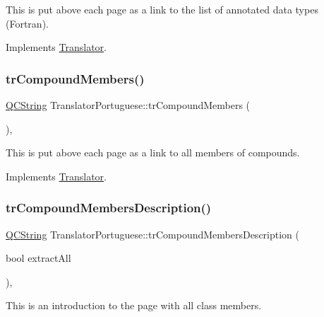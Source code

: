 This is put above each page as a link to the list of annotated data types (Fortran). 

Implements \mbox{\hyperlink{class_translator}{Translator}}.

\mbox{\label{class_translator_portuguese_a2b87e8d349a1ee07c93f6333b340874f}} 
\subsubsection{\texorpdfstring{trCompoundMembers()}{trCompoundMembers()}}
{\footnotesize\ttfamily \mbox{\hyperlink{class_q_c_string}{Q\+C\+String}} Translator\+Portuguese\+::tr\+Compound\+Members (\begin{DoxyParamCaption}{ }\end{DoxyParamCaption})\hspace{0.3cm}{\ttfamily [inline]}, {\ttfamily [virtual]}}

This is put above each page as a link to all members of compounds. 

Implements \mbox{\hyperlink{class_translator}{Translator}}.

\mbox{\label{class_translator_portuguese_aabde76a5a9e8d21c289609f9b7f7065b}} 
\subsubsection{\texorpdfstring{trCompoundMembersDescription()}{trCompoundMembersDescription()}}
{\footnotesize\ttfamily \mbox{\hyperlink{class_q_c_string}{Q\+C\+String}} Translator\+Portuguese\+::tr\+Compound\+Members\+Description (\begin{DoxyParamCaption}\item[{bool}]{extract\+All }\end{DoxyParamCaption})\hspace{0.3cm}{\ttfamily [inline]}, {\ttfamily [virtual]}}

This is an introduction to the page with all class members. 

